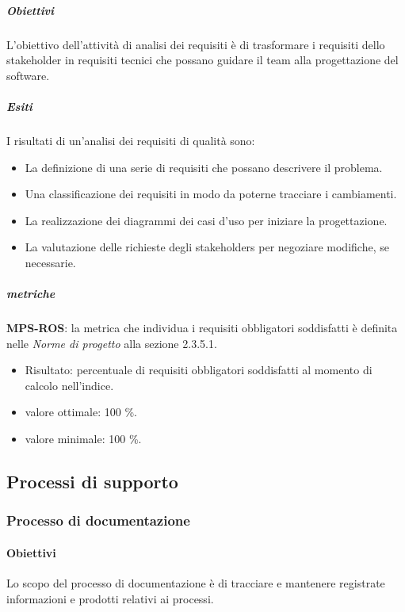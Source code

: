 \documentclass[../piano-di-qualifica.tex]{subfiles}
\begin{document}
\subparagraph{Obiettivi}%
\label{par:obiettivi}
L'obiettivo dell'attività di analisi dei requisiti è di trasformare i requisiti dello stakeholder in requisiti tecnici che possano guidare il team alla progettazione del software.

\subparagraph{Esiti}%
\label{par:esiti}
I risultati di un'analisi dei requisiti di qualità sono:
\begin{itemize}
  \item La definizione di una serie di requisiti che possano descrivere il problema.
  \item Una classificazione dei requisiti in modo da poterne tracciare i cambiamenti.
  \item La realizzazione dei diagrammi dei casi d'uso per iniziare la progettazione.
  \item La valutazione delle richieste degli stakeholders per negoziare modifiche, se necessarie.
\end{itemize}

\subparagraph{metriche}%
\label{par:metriche}

\textbf{MPS-ROS}: la metrica che individua i requisiti obbligatori soddisfatti è definita nelle \textit{Norme di progetto} alla sezione 2.3.5.1.
\begin{itemize}
  \item Risultato: percentuale di requisiti obbligatori soddisfatti al momento di calcolo nell'indice.
  \item valore ottimale: 100 \%.
  \item valore minimale: 100 \%.
\end{itemize}

\subsection{Processi di supporto}%
\label{sub:processi_di_supporto}

\subsubsection{Processo di documentazione}%
\label{subs:processo_di_documentazione}

\paragraph{Obiettivi}%
\label{par:obiettivi}
Lo scopo del processo di documentazione è di tracciare e mantenere registrate informazioni e prodotti relativi ai processi.
\end{document}
